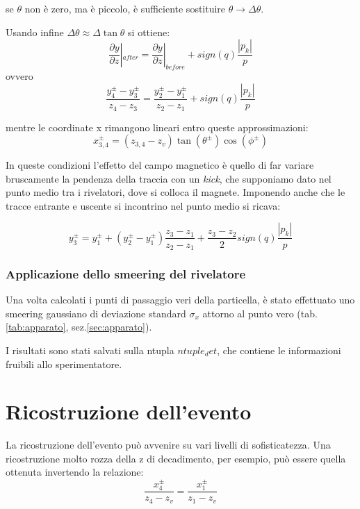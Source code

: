\documentclass[8pt]{extarticle}
\begin{document}
se $\theta$ non è zero, ma è piccolo, è sufficiente sostituire $\theta \rightarrow \Delta \theta$. 

Usando infine $\Delta \theta \approx \Delta \tan{\theta}$ si ottiene:
$$
\frac{\partial y}{\partial z}|_{after} = \frac{\partial y}{\partial z}|_{before} + sign(q)\frac{|p_k|}{p}
$$
ovvero
\begin{equation}
\frac{y_4^{\pm}-y_3^{\pm}}{z_4-z_3} = \frac{y_2^{\pm}-y_1^{\pm}}{z_2-z_1} + sign(q)\frac{|p_k|}{p}
\label{eq:curvatura}
\end{equation}


mentre le coordinate x rimangono lineari entro queste approssimazioni: 
\begin{equation}
x_{3,4}^{\pm} = (z_{3,4} - z_v) \tan(\theta^{\pm})\cos(\phi^{\pm})
\end{equation}

In queste condizioni l'effetto del campo magnetico è quello di far variare bruscamente la pendenza della traccia con un \textit{kick}, che supponiamo dato nel punto medio tra i rivelatori, dove si colloca il magnete. Imponendo anche che le tracce entrante e uscente si incontrino nel punto medio si ricava:

\begin{equation}
y_3^{\pm} = y_1^{\pm} + (y_2^{\pm}-y_1^{\pm})\frac{z_3-z_1}{z_2-z_1} + \frac{z_3-z_2}{2} sign(q) \frac{|p_k|}{p}
\end{equation}

\subsubsection{Applicazione dello smeering del rivelatore}
Una volta calcolati i punti di passaggio veri della particella, è stato effettuato uno smeering gaussiano di deviazione standard $\sigma_x$ attorno al punto vero (tab.\ref{tab:apparato}, sez.\ref{sec:apparato}).

I risultati sono stati salvati sulla ntupla $ntuple_det$, che contiene le informazioni fruibili allo sperimentatore.

\section{Ricostruzione dell'evento} \label{sec:reconstruction}

La ricostruzione dell'evento può avvenire su vari livelli di sofisticatezza. Una ricostruzione molto rozza della z di decadimento, per esempio, può essere quella ottenuta invertendo la relazione:
$$
\frac{x_4^{\pm}}{z_4-z_v} = \frac{x_1^{\pm}}{z_1-z_v}
$$
\end{document}
